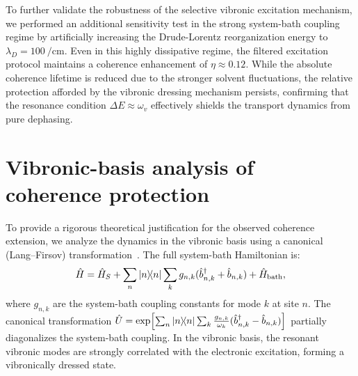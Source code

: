 \documentclass[11pt,a4paper]{article}
\begin{document}
To further validate the robustness of the selective vibronic excitation mechanism, we performed an additional sensitivity test in the strong system-bath coupling regime by artificially increasing the Drude-Lorentz reorganization energy to $\lambda_D = \SI{100}{\per\centi\meter}$. Even in this highly dissipative regime, the filtered excitation protocol maintains a coherence enhancement of $\eta \approx 0.12$. While the absolute coherence lifetime is reduced due to the stronger solvent fluctuations, the relative protection afforded by the vibronic dressing mechanism persists, confirming that the resonance condition $\Delta E \approx \omega_v$ effectively shields the transport dynamics from pure dephasing.


\section{Vibronic-basis analysis of coherence protection}
\label{sec:S7}

To provide a rigorous theoretical justification for the observed coherence extension, we analyze the dynamics in the vibronic basis using a canonical (Lang--Firsov) transformation~\cite{Huelga2013,Chin2011}. The full system-bath Hamiltonian is:
\begin{equation}
\hat{H} = \hat{H}_S + \sum_n \dyad{n} \sum_k g_{n,k}(\hat{b}_{n,k}^\dagger + \hat{b}_{n,k}) + \hat{H}_{\mathrm{bath}},
\label{eq:SI_full_hamiltonian}
\end{equation}
where $g_{n,k}$ are the system-bath coupling constants for mode $k$ at site $n$. The canonical transformation $\hat{U} = \exp\!\left[\sum_n \dyad{n} \sum_k \frac{g_{n,k}}{\omega_k}(\hat{b}_{n,k}^\dagger - \hat{b}_{n,k})\right]$ partially diagonalizes the system-bath coupling. In the vibronic basis, the resonant vibronic modes are strongly correlated with the electronic excitation, forming a vibronically dressed state.
\end{document}
